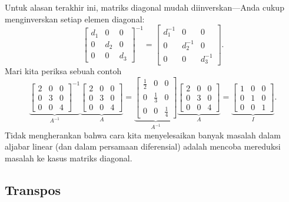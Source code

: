 Untuk alasan terakhir ini, matriks diagonal mudah diinverskan---Anda cukup menginverskan setiap elemen diagonal:
\begin{equation*}
\begin{bmatrix}
d_1 & 0 & 0 \\
0 & d_2 & 0 \\
0 & 0 & d_3
\end{bmatrix}^{-1}
=
\begin{bmatrix}
d_1^{-1} & 0 & 0 \\
0 & d_2^{-1} & 0 \\
0 & 0 & d_3^{-1}
\end{bmatrix} .
\end{equation*}
Mari kita periksa sebuah contoh
\begin{equation*}
\underbrace{
\begin{bmatrix}
2 & 0 & 0 \\
0 & 3 & 0 \\
0 & 0 & 4
\end{bmatrix}^{-1}
}_{A^{-1}}
\underbrace{
\begin{bmatrix}
2 & 0 & 0 \\
0 & 3 & 0 \\
0 & 0 & 4
\end{bmatrix}
}_{A}
=
\underbrace{
\begin{bmatrix}
\frac{1}{2} & 0 & 0 \\
0 & \frac{1}{3} & 0 \\
0 & 0 & \frac{1}{4}
\end{bmatrix}
}_{A^{-1}}
\underbrace{
\begin{bmatrix}
2 & 0 & 0 \\
0 & 3 & 0 \\
0 & 0 & 4
\end{bmatrix}
}_{A}
=
\underbrace{
\begin{bmatrix}
1 & 0 & 0 \\
0 & 1 & 0 \\
0 & 0 & 1
\end{bmatrix}
}_{I} .
\end{equation*}
Tidak mengherankan bahwa cara kita menyelesaikan banyak masalah dalam aljabar linear
(dan dalam persamaan diferensial) adalah mencoba mereduksi masalah ke
kasus matriks diagonal.

\subsection{Transpos}

